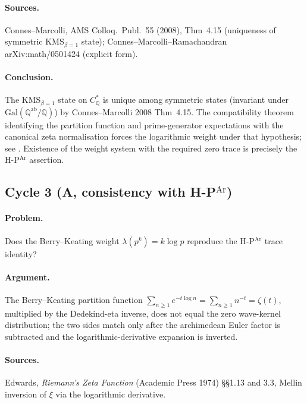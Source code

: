 \paragraph{Sources.} Connes--Marcolli, AMS Colloq.~Publ.~55
(2008), Thm~4.15 (uniqueness of symmetric KMS\({}_{\beta=1}\) state);
Connes--Marcolli--Ramachandran arXiv:math/0501424 (explicit form).

\paragraph{Conclusion.} The KMS\({}_{\beta=1}\) state on
\(C^{*}_{\mathbb{Q}}\) is unique among symmetric states
(invariant under \(\mathrm{Gal}(\mathbb{Q}^{\mathrm{ab}}/\mathbb{Q})\))
by Connes--Marcolli 2008 Thm~4.15. The compatibility theorem
identifying the partition function and prime-generator expectations
with the canonical zeta normalisation forces the logarithmic weight
under that hypothesis; see
. Existence
of the weight system with the required zero trace is precisely the
H-P\(^{\mathrm{Ar}}\) assertion.

\subsection{Cycle 3 (A, consistency with H-P\(^{\mathrm{Ar}}\))}
\label{v4-arith:hpar-det:cycle-3}

\paragraph{Problem.} Does the Berry--Keating weight
\(\lambda(p^{k})=k\log p\) reproduce the H-P\(^{\mathrm{Ar}}\) trace
identity?

\paragraph{Argument.} The Berry--Keating partition function
\(\sum_{n\geq 1}e^{-t\log n}=\sum_{n\geq 1}n^{-t}=\zeta(t)\), multiplied
by the Dedekind-eta inverse, does not equal the zero
wave-kernel distribution;
the two sides match only after the archimedean Euler factor is
subtracted and the logarithmic-derivative expansion is inverted.

\paragraph{Sources.} Edwards, \emph{Riemann's Zeta Function}
(Academic Press 1974) \S\S1.13 and 3.3, Mellin inversion of \(\xi\)
via the logarithmic derivative.

